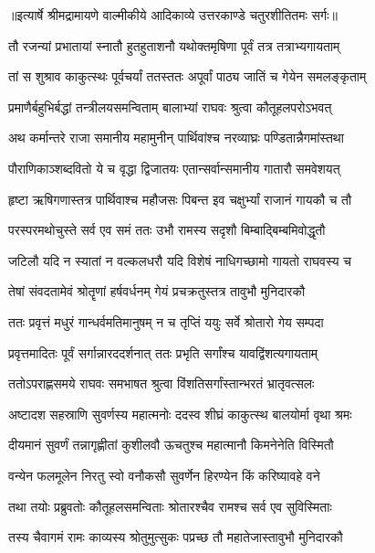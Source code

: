 {॥इत्यार्षे श्रीमद्रामायणे वाल्मीकीये आदिकाव्ये उत्तरकाण्डे चतुरशीतितमः सर्गः॥}


\twolineshloka
{तौ रजन्यां प्रभातायां स्नातौ हुतहुताशनौ}
{यथोक्तमृषिणा पूर्वं तत्र तत्राभ्यगायताम्} %

\twolineshloka
{तां स शुश्राव काकुत्स्थः पूर्वचर्यां ततस्ततः}
{अपूर्वां पाठ्य जातिं च गेयेन समलङ्कृताम्} %

\twolineshloka
{प्रमाणैर्बहुभिर्बद्धां तन्त्रीलयसमन्विताम्}
{बालाभ्यां राघवः श्रुत्वा कौतूहलपरोऽभवत्} %

\twolineshloka
{अथ कर्मान्तरे राजा समानीय महामुनीन्}
{पार्थिवांश्च नरव्याघ्रः पण्डितान्नैगमांस्तथा} %

\twolineshloka
{पौराणिकाञ्शब्दवितो ये च वृद्धा द्विजातयः}
{एतान्सर्वान्समानीय गातारौ समवेशयत्} %

\twolineshloka
{हृष्टा ऋषिगणास्तत्र पार्थिवाश्च महौजसः}
{पिबन्त इव चक्षुर्भ्यां राजानं गायकौ च तौ} %

\twolineshloka
{परस्परमथोचुस्ते सर्व एव समं ततः}
{उभौ रामस्य सदृशौ बिम्बाद्बिम्बमिवोद्धृतौ} %

\twolineshloka
{जटिलौ यदि न स्यातां न वल्कलधरौ यदि}
{विशेषं नाधिगच्छामो गायतो राघवस्य च} %

\twolineshloka
{तेषां संवदतामेवं श्रोतॄणां हर्षवर्धनम्}
{गेयं प्रचक्रतुस्तत्र तावुभौ मुनिदारकौ} %

\twolineshloka
{ततः प्रवृत्तं मधुरं गान्धर्वमतिमानुषम्}
{न च तृप्तिं ययुः सर्वे श्रोतारो गेय सम्पदा} %

\twolineshloka
{प्रवृत्तमादितः पूर्वं सर्गान्नारददर्शनात्}
{ततः प्रभृति सर्गांश्च यावद्विंशत्यगायताम्} %

\twolineshloka
{ततोऽपराह्णसमये राघवः समभाषत}
{श्रुत्वा विंशतिसर्गांस्तान्भरतं भ्रातृवत्सलः} %

\twolineshloka
{अष्टादश सहस्राणि सुवर्णस्य महात्मनोः}
{ददस्व शीघ्रं काकुत्स्थ बालयोर्मा वृथा श्रमः} %

\twolineshloka
{दीयमानं सुवर्णं तन्नागृह्णीतां कुशीलवौ}
{ऊचतुश्च महात्मानौ किमनेनेति विस्मितौ} %

\twolineshloka
{वन्येन फलमूलेन निरतु स्वो वनौकसौ}
{सुवर्णेन हिरण्येन किं करिष्यावहे वने} %

\twolineshloka
{तथा तयोः प्रब्रुवतोः कौतूहलसमन्विताः}
{श्रोतारश्चैव रामश्च सर्व एव सुविस्मिताः} %

\twolineshloka
{तस्य चैवागमं रामः काव्यस्य श्रोतुमुत्सुकः}
{पप्रच्छ तौ महातेजास्तावुभौ मुनिदारकौ} %

